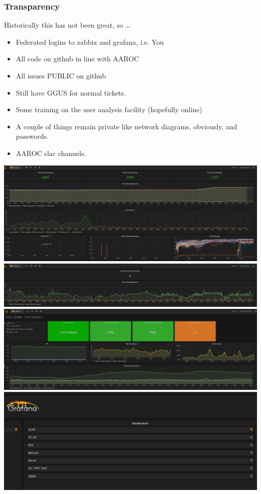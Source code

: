\documentclass{beamer}
\begin{document}
\begin{frame}
  \frametitle{Transparency}
  Historically this has not been great, so \ldots
  \begin{itemize}
    \item Federated logins to zabbix and grafana, i.e. You
    \item All code on github in line with AAROC
    \item All issues PUBLIC on github
    \item Still have GGUS for normal tickets.
    \item Some training on the user analysis facility (hopefully online)
    \item A couple of things remain private like network diagrams, obviously, and passwords.
    \item AAROC slac channels.
  \end{itemize}
\end{frame}
\begin{frame}
  \includegraphics[scale=0.25]{ALICEProcessing-Grafana.pdf}\\
  \includegraphics[scale=0.25]{ATLASProcessing-Grafana.pdf}\\
  \includegraphics[scale=0.25]{Server50-Grafana.pdf}\\
  \includegraphics[scale=0.25]{GrafanaMenu.pdf}
\end{frame}
\end{document}
